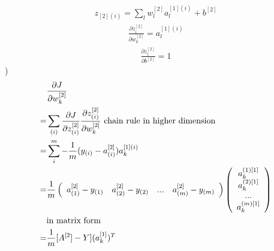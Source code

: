 \documentclass[a4paper]{article}
\begin{document}
\begin{align*}
	z_{[2](i)} = \sum_l w_l^{[2]} a_l^{[1](i)} + b^{[2]}
\end{align*}
\begin{align*}
	\frac{\partial z_{i}^{[2]}}{ \partial w_k^{[2]}} = a_l ^{[1](i)}
\end{align*}
\begin{align*}
	\frac{\partial z_{i}^{[2]}}{\partial  b^{[2]}} = 1
\end{align*}
)
\begin{align*}
	 & \frac{\partial J}{\partial w_k^{[2]}}\\
	= & \sum_{(i)} \frac{\partial J}{\partial z_{(i)}^{[2]}} \frac{\partial  z_{(i)}^{[2]}}{\partial  w_k^{[2]}} \textmd { chain rule in higher dimension}\\
	= &\sum_{i}^{m} -\frac{1}{m} (y_{(i)} - a_{(i)}^{[2]}) a_k^{[1](i)}\\
	= &\frac{1}{m} \left( \begin{array} {c c c c}
	 a_{(1)}^{[2]} - y_{(1)} & a_{(2)}^{[2]} - y_{(2)} & ... & a_{(m)}^{[2]} - y_{(m)}  \\
	\end{array} \right)
	\left( \begin{array} {c }
	 a_k^{(1)[1]}  \\
	 a_k^{(2)[1]}  \\
		... \\
	 a_k^{(m)[1]}  \\
	\end{array} \right)\\
	&\textrm {in matrix form}\\
	= &\frac{1}{m} [A^{[2}] - Y] (a_k^{[1]})^T	
\end{align*}
\end{document}
